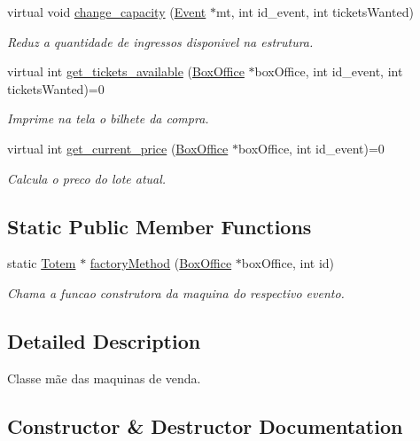 \begin{DoxyCompactItemize}
virtual void \hyperlink{class_totem_a2cc7898315e4c14036b2a01a38325f2d}{change\+\_\+capacity} (\hyperlink{class_event}{Event} $\ast$mt, int id\+\_\+event, int tickets\+Wanted)
\begin{DoxyCompactList}\small\item\em Reduz a quantidade de ingressos disponivel na estrutura. \end{DoxyCompactList}\item 
virtual int \hyperlink{class_totem_a1849ecd70214b1b2a1b4c116fdbf6d81}{get\+\_\+tickets\+\_\+available} (\hyperlink{class_box_office}{Box\+Office} $\ast$box\+Office, int id\+\_\+event, int tickets\+Wanted)=0
\begin{DoxyCompactList}\small\item\em Imprime na tela o bilhete da compra. \end{DoxyCompactList}\item 
virtual int \hyperlink{class_totem_ae05433d0eebc0f403d904700499f091b}{get\+\_\+current\+\_\+price} (\hyperlink{class_box_office}{Box\+Office} $\ast$box\+Office, int id\+\_\+event)=0
\begin{DoxyCompactList}\small\item\em Calcula o preco do lote atual. \end{DoxyCompactList}\end{DoxyCompactItemize}
\subsection*{Static Public Member Functions}
\begin{DoxyCompactItemize}
\item 
static \hyperlink{class_totem}{Totem} $\ast$ \hyperlink{class_totem_a796d3c828ae38b68ff0a4c97344429de}{factory\+Method} (\hyperlink{class_box_office}{Box\+Office} $\ast$box\+Office, int id)
\begin{DoxyCompactList}\small\item\em Chama a funcao construtora da maquina do respectivo evento. \end{DoxyCompactList}\end{DoxyCompactItemize}


\subsection{Detailed Description}
Classe mãe das maquinas de venda. 

\subsection{Constructor \& Destructor Documentation}
\mbox{\label{class_totem_a21614625adf52c03a7281f2738771495}} 
